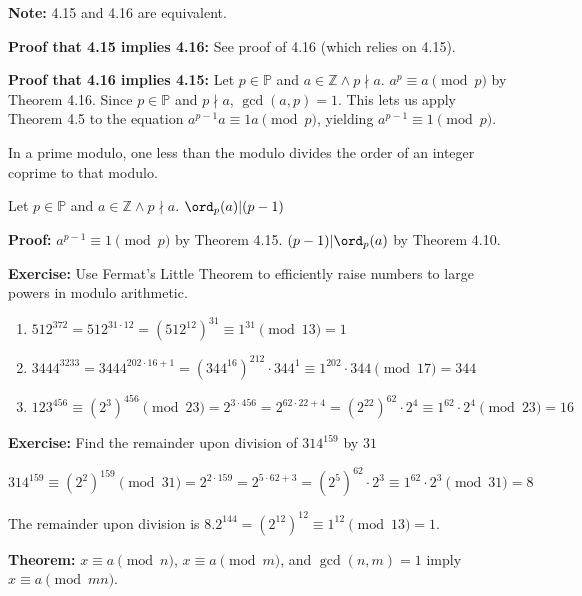 \item \textbf{Note:} 4.15 and 4.16 are equivalent.

\textbf{Proof that 4.15 implies 4.16:} See proof of 4.16 (which relies on 4.15).

\textbf{Proof that 4.16 implies 4.15:} Let \(p \in \mathbb P\) and \(a \in \mathbb Z \wedge p \nmid a\). \(a^p \equiv a \pmod p\) by Theorem 4.16. Since \(p \in \mathbb P\) and \(p \nmid a\), \(\gcd(a, p) = 1\). This lets us apply Theorem 4.5 to the equation \(a^{p-1} a \equiv 1 a \pmod p\), yielding \(a^{p-1} \equiv 1 \pmod p\).

\item In a prime modulo, one less than the modulo divides the order of an integer coprime to that modulo.

Let \(p \in \mathbb P\) and \(a \in \mathbb Z \wedge p \nmid a\). \(\ord_p(a) | (p-1)\)

\textbf{Proof:} \(a^{p-1} \equiv 1 \pmod p\) by Theorem 4.15. \((p-1)|\ord_p(a)\) by Theorem 4.10.

\item \textbf{Exercise:} Use Fermat's Little Theorem to efficiently raise numbers to large powers in modulo arithmetic.

\begin{enumerate}
\item \(512^{372} = 512^{31 \cdot 12} = (512^{12})^{31} \equiv 1^{31} \pmod{13} = 1\)
\item \(3444^{3233} = 3444^{202 \cdot 16 + 1} = (344^{16})^{212} \cdot 344^1 \equiv 1^{202} \cdot 344 \pmod{17} = 344\)
\item \(123^{456} \equiv (2^3)^{456} \pmod{23} = 2^{3 \cdot 456} = 2^{62 \cdot 22 + 4} = (2^{22})^{62} \cdot 2^4 \equiv 1^{62} \cdot 2^4 \pmod{23} = 16\)
\end{enumerate}

\item \textbf{Exercise:} Find the remainder upon division of \(314^{159}\) by \(31\)

\(314^{159} \equiv (2^2)^{159} \pmod {31} = 2^{2 \cdot 159} = 2^{5 \cdot 62 + 3} = (2^5)^{62} \cdot 2^3 \equiv 1^62 \cdot 2^3 \pmod {31} = 8\)

The remainder upon division is 8.\(2^{144} = (2^{12})^{12} \equiv 1^{12} \pmod 13 = 1\).

\item \textbf{Theorem:} \(x \equiv a \pmod n\), \(x \equiv a \pmod m\), and \(\gcd(n, m) = 1\) imply \(x \equiv a \pmod {mn}\).

